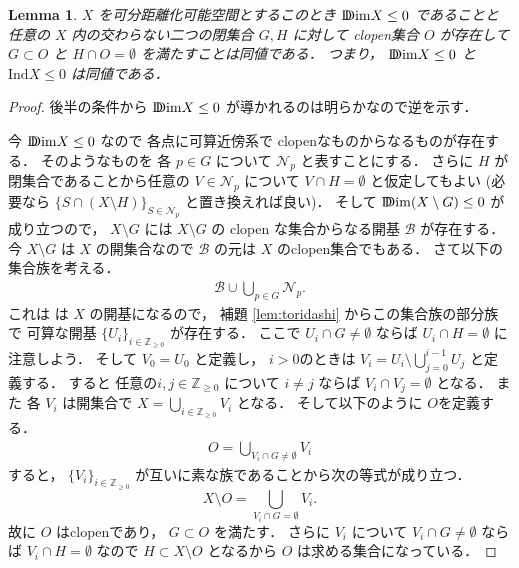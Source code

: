 \documentclass[leqno, a4paper, 12pt]{jsarticle}
\theoremstyle{plain}
\newtheorem{lem}[thm]{Lemma}
\theoremstyle{definition}
\theoremstyle{remark}
\newcommand{\zz}{\mathbb{Z}}
\newcommand{\yolind}{\mathrm{Ind}}
\newcommand{\yoddim}{\mathrm{D\hspace{-5.5pt}Dim}}
\numberwithin{equation}{section}
\begin{document}
\begin{lem}\label{lem:ultranormal}
$X$
を可分距離化可能空間とするこのとき
$\yoddim X\le 0$
であることと
任意の
$X$
内の交わらない二つの閉集合
$G, H$
に対して
clopen集合
$O$
が存在して
$G\subset O$
と
$H\cap O=\emptyset$
を満たすことは同値である．
つまり，
$\yoddim X\le 0$
と
$\yolind X\le 0$
は同値である．
\end{lem}
\begin{proof}
後半の条件から
$\yoddim X\le 0$
が導かれるのは明らかなので逆を示す．

今
$\yoddim X\le 0$
なので
各点に可算近傍系で
clopenなものからなるものが存在する．
そのようなものを
各
$p\in G$
について
$\mathcal{N}_{p}$
と表すことにする．
さらに
$H$
が閉集合であることから任意の
$V\in \mathcal{N}_{p}$
について
$V\cap H=\emptyset$
と仮定してもよい
(必要なら
$\{S\cap (X\setminus H)\}_{S\in \mathcal{N}_{p}}$
と置き換えれば良い)．
そして
$\yoddim (X\setminus G)\le 0$
が成り立つので，
$X\setminus G$
には
$X\setminus G$
の
clopen
な集合からなる開基
$\mathcal{B}$
が存在する．
今
$X\setminus G$
は
$X$
の開集合なので
$\mathcal{B}$
の元は
$X$
のclopen集合でもある．
さて以下の集合族を考える．
\begin{align}
\mathcal{B}\cup \bigcup_{p\in G}\mathcal{N}_{p}. 
\end{align}
これは
は
$X$
の開基になるので，
補題 
\ref{lem:toridashi}
からこの集合族の部分族で
可算な開基
$\{U_{i}\}_{i\in \zz_{\ge 0}}$
が存在する．
ここで
$U_{i}\cap G\neq \emptyset$
ならば
$U_{i}\cap H=\emptyset$
に注意しよう．
そして
$V_{0}=U_{0}$
と定義し，
$i>0$のときは
$V_{i}=U_{i}\setminus \bigcup_{j=0}^{i-1}U_{j}$
と定義する．
すると
任意の$i, j\in \zz_{\ge 0}$
について
$i\neq j$
ならば
$V_{i}\cap V_{j}=\emptyset$
となる．
また
各
$V_{i}$
は開集合で
$X=\bigcup_{i\in \zz_{\ge 0}}V_{i}$
となる．
そして以下のように
$O$を定義する．
\begin{align}
O=\bigcup_{V_{i}\cap G\neq \emptyset}V_{i}
\end{align}
すると，
$\{V_{i}\}_{i\in \zz_{\ge 0}}$
が互いに素な族であることから次の等式が成り立つ．
\[
X\setminus O=\bigcup_{V_{i}\cap G= \emptyset}V_{i}. 
\]
故に
$O$
はclopenであり，
$G\subset O$
を満たす．
さらに
$V_{i}$
について
$V_{i}\cap G\neq \emptyset$
ならば
$V_{i}\cap H=\emptyset$
なので
$H\subset X\setminus O$
となるから
$O$
は求める集合になっている．
\end{proof}
\end{document}
